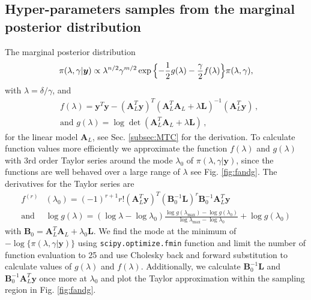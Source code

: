 \subsection{Hyper-parameters samples from the marginal posterior distribution}
\label{subsec:firstMarg}
The marginal posterior distribution 
\begin{align}
	\pi(\lambda, \gamma | \bm{y})
	\propto  \lambda^{n/2} \gamma^{m/2}   \exp{ \Bigl\{ - \frac{1}{2} g ( \lambda) - \frac{\gamma}{2} f ( \lambda) \Bigr\} } \pi(\lambda, \gamma),
	\label{eq:MargPostAppl}
\end{align}
with $\lambda = \delta / \gamma$, and
\begin{subequations}
	\label{eq:fandg}
	\begin{align}
		&f ( \lambda) = \bm{y}^T \bm{y} - (\bm{A}_L^T \bm{y})^T (\bm{A}_L^T  \bm{A}_L + \lambda \bm{L})^{-1} (\bm{A}_L^T \bm{y})  \, ,  \\
		&\text{and } g(\lambda) = \log \det (\bm{A}_L^T  \bm{A}_L + \lambda \bm{L}) \, ,
	\end{align}
\end{subequations}
for the linear model $\bm{A}_L$, see Sec. \ref{subsec:MTC} for the derivation.
To calculate function values more efficiently we approximate the function $f(\lambda)$ and $g(\lambda)$ with 3rd order Taylor series around the mode $\lambda_0$ of $\pi(\lambda, \gamma | \bm{y})$, since the functions are well behaved over a large range of $\lambda$ see Fig. \ref{fig:fandg}.
The derivatives for the Taylor series are
\begin{align}
	f^{(r)}& (\lambda_0)= (-1)^{r+1} r! (\bm{A}_L^T \bm{y})^T (\bm{B}_0^{-1} \bm{L})^r \bm{B}_0^{-1} \bm{A}_L^T \bm{y} \label{eq:ftay}  \\
	\text{and } & \log{ g(\lambda)} = (\log{\lambda} - \log{\lambda_{0}})  \frac{ \log{g(\lambda_{\text{max}})} - \log{g(\lambda_{0})} }{\log{\lambda_{\text{max}}} - \log{\lambda_{0}} } + \log{ g(\lambda_{0})} 
	\label{eq:gtay}
\end{align} 
with $\bm{B}_0 = \bm{A}_L^T  \bm{A}_L + \lambda_0 \bm{L}$.
We find the mode at the minimum of  $-\log\{ \pi(\lambda, \gamma | \bm{y}) \}$  using \texttt{scipy.optimize.fmin} function and limit the number of function evaluation to 25 and use Cholesky back and forward substitution to calculate values of $g(\lambda)$ and $f(\lambda)$.
Additionally, we calculate $\bm{B}_0^{-1} \bm{L} $ and  $\bm{B}_0^{-1}  \bm{A}_L^T \bm{y}$ once more at $\lambda_0$ and plot the Taylor approximation within the sampling region in Fig. \ref{fig:fandg}.
